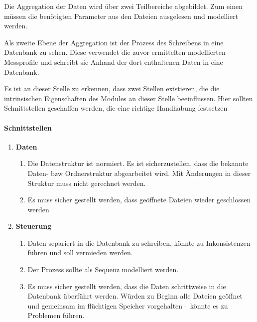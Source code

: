 Die Aggregation der Daten wird über zwei Teilbereiche abgebildet. Zum einen müssen die benötigten Parameter aus den Dateien ausgelesen und modelliert werden. 

Als zweite Ebene der Aggregation ist der Prozess des Schreibens in eine Datenbank zu sehen. Diese verwendet die zuvor ermittelten modellierten Messprofile und schreibt sie Anhand der dort enthaltenen Daten in eine Datenbank.


Es ist an dieser Stelle zu erkennen, dass zwei Stellen existieren, die die intrinsischen Eigenschaften des Modules an dieser Stelle beeinflussen. Hier sollten Schnittstellen geschaffen werden, die eine richtige Handhabung festsetzen

\paragraph{Schnittstellen}

\begin{enumerate}

\item \textbf{Daten}  
    \begin{enumerate}
        \item Die Datenstruktur ist normiert. Es ist sicherzustellen, dass die bekannte Daten- bzw Ordnerstruktur abgearbeitet wird. Mit Änderungen in dieser Struktur muss nicht gerechnet werden.
        \item Es muss sicher gestellt werden, dass geöffnete Dateien wieder geschlossen werden
    \end{enumerate}

\item \textbf{Steuerung} 
    \begin{enumerate}
        \item Daten separiert in die Datenbank zu schreiben, könnte zu Inkonsistenzen führen und soll vermieden werden.
        \item Der Prozess sollte als Sequenz modelliert werden.
        \item Es muss sicher gestellt werden, dass die Daten schrittweise in die Datenbank überführt werden. Würden zu Beginn alle Dateien geöffnet und gemeinsam im flüchtigen Speicher vorgehalten· könnte es zu Problemen führen.
    \end{enumerate}

\end{enumerate}

        


